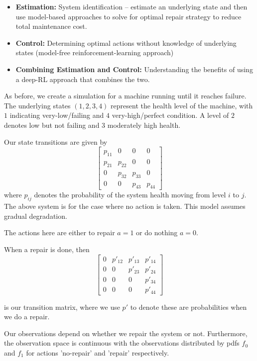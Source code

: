 \documentclass[english]{article}
\numberwithin{equation}{section}
\begin{document}
	\begin{itemize}
		\item \textbf{Estimation:} System identification -- estimate an underlying state and then use model-based approaches to solve for optimal repair strategy to reduce total maintenance cost.
		\item \textbf{Control:} Determining optimal actions without knowledge of underlying states (model-free reinforcement-learning approach)
		\item \textbf{Combining Estimation and Control:} Understanding the benefits of using a deep-RL approach that combines the two.
	\end{itemize}
	
	
	As before, we create a simulation for a machine running until it reaches failure. The underlying states $(1,2,3,4)$ represent the health level of the machine, with $1$ indicating very-low/failing and $4$ very-high/perfect condition. A level of $2$ denotes low but not failing and $3$ moderately high health.
	
	Our state transitions are given by 
	$$
	\begin{bmatrix}
	p_{11} & 0 & 0 & 0 \\
	p_{21} & p_{22} & 0 & 0 \\
	0 & p_{32} & p_{33} & 0 \\
	0 & 0 & p_{43} & p_{44}
	\end{bmatrix}
	$$
	where $p_{ij}$ denotes the probability of the system health moving from level $i$ to $j$. The above system is for the case where no action is taken. This model assumes gradual degradation.
	
	The actions here are either to repair $a=1$ or do nothing $a=0$.
	
	When a repair is done, then
	$$
	\begin{bmatrix}
	0 & p'_{12} & p'_{13} & p'_{14} \\
	0 & 0 & p'_{23} & p'_{24} \\
	0 & 0 & 0 & p'_{34} \\
	0 & 0 & 0 & p'_{44}
	\end{bmatrix}
	$$
	
	is our transition matrix, where we use $p'$ to denote these are probabilities when we do a repair.
	
	Our observations depend on whether we repair the system or not. Furthermore, the observation space is continuous with the observations distributed by pdfs $f_0$ and $f_1$ for actions 'no-repair' and 'repair' respectively.
	
\end{document}
